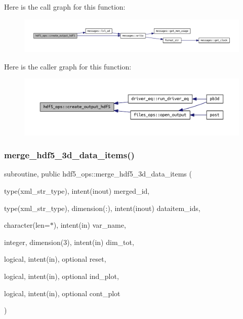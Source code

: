 Here is the call graph for this function\+:
\nopagebreak
\begin{figure}[H]
\begin{center}
\leavevmode
\includegraphics[width=350pt]{namespacehdf5__ops_a1263636fffc4f4aa86f72bd5fd3352a0_cgraph}
\end{center}
\end{figure}
Here is the caller graph for this function\+:
\nopagebreak
\begin{figure}[H]
\begin{center}
\leavevmode
\includegraphics[width=350pt]{namespacehdf5__ops_a1263636fffc4f4aa86f72bd5fd3352a0_icgraph}
\end{center}
\end{figure}
\mbox{\label{namespacehdf5__ops_a7b18b66402089eef2288b2d532f6af5d}} 
\subsubsection{\texorpdfstring{merge\+\_\+hdf5\+\_\+3d\+\_\+data\+\_\+items()}{merge\_hdf5\_3d\_data\_items()}}
{\footnotesize\ttfamily subroutine, public hdf5\+\_\+ops\+::merge\+\_\+hdf5\+\_\+3d\+\_\+data\+\_\+items (\begin{DoxyParamCaption}\item[{type(xml\+\_\+str\+\_\+type), intent(inout)}]{merged\+\_\+id,  }\item[{type(xml\+\_\+str\+\_\+type), dimension(\+:), intent(inout)}]{dataitem\+\_\+ids,  }\item[{character(len=$\ast$), intent(in)}]{var\+\_\+name,  }\item[{integer, dimension(3), intent(in)}]{dim\+\_\+tot,  }\item[{logical, intent(in), optional}]{reset,  }\item[{logical, intent(in), optional}]{ind\+\_\+plot,  }\item[{logical, intent(in), optional}]{cont\+\_\+plot }\end{DoxyParamCaption})}



